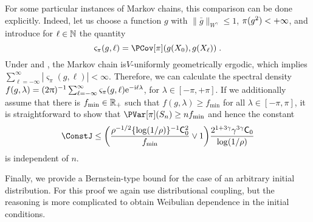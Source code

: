 \documentclass[sn-mathphys,Numbered]{sn-jnl}%
\begin{document}
\begin{remark}
\label{rem:lower_bound_variance}
For some particular instances of Markov chains, this comparison can be done explicitly. Indeed, let us choose a function $g$ with $\|\bar{g}\|_{W^\gamma} \leq 1$, $\pi(g^2) < +\infty$, and introduce for $\ell \in \mathbb{N}$ the quantity
\[
\varsigma_\pi(g,\ell) = \PCov[\pi]( g(X_0),g(X_{\ell}))\eqsp.
\]
Under  and , the Markov chain is$V$-uniformly geometrically ergodic, which implies $\sum_{\ell=-\infty}^\infty | \varsigma_\pi(g,\ell)| < \infty$.
Therefore, we can calculate the spectral density $f(g,\lambda)= (2\uppi)^{-1}\sum_{\ell = -\infty}^{\infty} \varsigma_\pi(g,\ell) \mathrm{e}^{-\mathrm{i} \ell \lambda}$, for $\lambda \in [-\pi,+\pi]$. If we additionally assume that there is $f_{\min} \in \mathbb{R}_{+}$ such that $f(g,\lambda) \geq f_{\min}$ for all $\lambda \in [-\pi,\pi]$, it is straightforward to show that $\PVar[\pi](S_n) \geq n f_{\min}$ and hence the constant
\[
\ConstJ \leq \biggl(\frac{\ratev^{-1/2} \{\log(1/\ratev)\}^{-1} \Constmainros^{2}}{f_{\min}} \vee 1\biggr) \frac{ 2^{1+3\gamma}\gamma^{3\gamma} \Constmainros}{\log(1/\ratev)}
\]
is independent of $n$.
\end{remark}
Finally, we provide a Bernstein-type bound for the case of an arbitrary initial distribution. For this proof we again use distributional coupling, but the reasoning is more complicated to obtain Weibulian dependence in the initial conditions.
\begin{comment}
\begin{corollary}
\label{th:rosenthal_log_V_cor_1}
Under assumptions of \Cref{th:rosenthal_log_V}, for any $q \geq 1$
\begin{equation}
\PE_{\pi}[|S_n|^{2q}] \leq 2^{2q+1}q!\{\PVar[\pi](S_n)\}^q + 2\rme \Constroslogmom^{q} q^{(6+6\gamma)q} \ConstB^{(6+6\gamma)q}\eqsp,
\end{equation}
where
\begin{equation}
\label{eq:const_K_2_def}
\Constroslogmom = 2^{18+18\gamma}\rme^{-(3\gamma+3)}(3\gamma+3)^{6\gamma+6}\eqsp.
\end{equation}
\end{corollary}
\begin{proof}
The proof is postponed to ~\Cref{sec:proof_moment_corollary_bentkus}.
\end{proof}
\end{comment}
\end{document}
